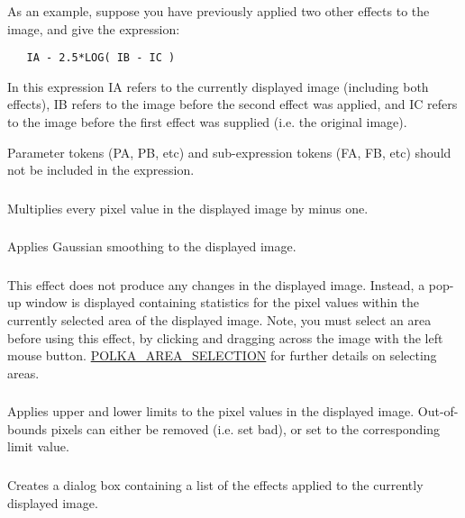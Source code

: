 As an example, suppose you have previously applied two other effects to
the image, and give the expression:

\begin{verbatim}
   IA - 2.5*LOG( IB - IC )
\end{verbatim}

In this expression IA refers to the currently displayed image (including
both effects), IB refers to the image before the second effect was
applied, and IC refers to the image before the first effect was supplied
(i.e. the original image).

Parameter tokens (PA, PB, etc) and sub-expression tokens (FA, FB, etc) should 
not be included in the expression.

\subsubsection { } 
Multiplies every pixel value in the displayed image by minus one.

\subsubsection { }
Applies Gaussian smoothing to the displayed image.

\subsubsection { } 
This effect does not produce any changes in the displayed image. Instead,
a pop-up window is displayed containing statistics for the pixel values
within the currently selected area of the displayed image. Note, you must
select an area before using this effect, by clicking and dragging across
the image with the left mouse button. \hyperref{Go here}{See section
}{}{POLKA_AREA_SELECTION} for further details on selecting areas.

\subsubsection { } 
Applies upper and lower limits to the pixel values in the displayed image.
Out-of-bounds pixels can either be removed (i.e. set bad), or set to the 
corresponding limit value.

\subsubsection { }
Creates a dialog box containing a list of the effects applied to the 
currently displayed image.


